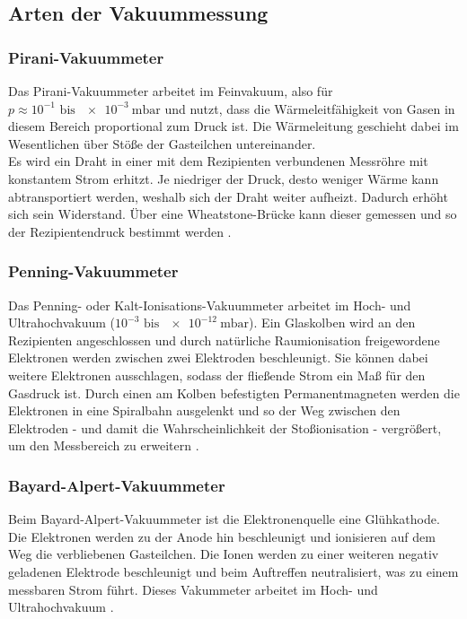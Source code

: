 \subsection{Arten der Vakuummessung}

\subsubsection{Pirani-Vakuummeter}

Das Pirani-Vakuummeter arbeitet im Feinvakuum, also für $p\approx 10^{-1}\text{ bis }\SI{e-3}{\milli\bar}$ und nutzt, dass die Wärmeleitfähigkeit von Gasen in diesem Bereich proportional zum Druck ist. Die Wärmeleitung geschieht dabei im Wesentlichen über Stöße der Gasteilchen untereinander.\\
Es wird ein Draht in einer mit dem Rezipienten verbundenen Messröhre mit konstantem Strom erhitzt. Je niedriger der Druck, desto weniger Wärme kann abtransportiert werden, weshalb sich der Draht weiter aufheizt. Dadurch erhöht sich sein Widerstand. Über eine Wheatstone-Brücke kann dieser gemessen und so der Rezipientendruck bestimmt werden \cite{Jena}.

\subsubsection{Penning-Vakuummeter}

Das Penning- oder Kalt-Ionisations-Vakuummeter arbeitet im Hoch- und Ultrahochvakuum ($10^{-3} \text{ bis } \SI{e-12}{\milli\bar}$). Ein Glaskolben wird an den Rezipienten angeschlossen und durch natürliche Raumionisation freigewordene Elektronen werden zwischen zwei Elektroden beschleunigt. Sie können dabei weitere Elektronen ausschlagen, sodass der fließende Strom ein Maß für den Gasdruck ist. Durch einen am Kolben befestigten Permanentmagneten werden die Elektronen in eine Spiralbahn ausgelenkt und so der Weg zwischen den Elektroden - und damit die Wahrscheinlichkeit der Stoßionisation - vergrößert, um den Messbereich zu erweitern \cite{Jena}.

\subsubsection{Bayard-Alpert-Vakuummeter}

Beim Bayard-Alpert-Vakuummeter ist die Elektronenquelle eine Glühkathode. Die Elektronen werden zu der Anode hin beschleunigt und ionisieren auf dem Weg die verbliebenen Gasteilchen. Die Ionen werden zu einer weiteren negativ geladenen Elektrode beschleunigt und beim Auftreffen neutralisiert, was zu einem messbaren Strom führt. Dieses Vakummeter arbeitet im Hoch- und Ultrahochvakuum \cite{Spektrum}.

